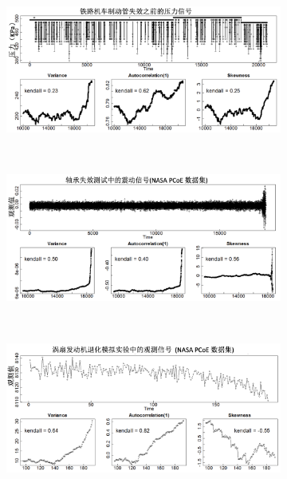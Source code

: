 \begin{figure}[H]
\centering
\begin{subfigure}{\textwidth}
    \centering
    \includegraphics[scale=0.6]{figures/csd/csd-signal-locomotive.png}
\end{subfigure}\\
\begin{subfigure}{\textwidth}
  \centering
  \includegraphics[scale=0.6]{figures/csd/csd-signal-bearing.png}
\end{subfigure}\\
\begin{subfigure}{\textwidth}
    \centering
    \includegraphics[scale=0.6]{figures/csd/csd-signal-turbofan.png}
\end{subfigure}\\

\end{figure}
